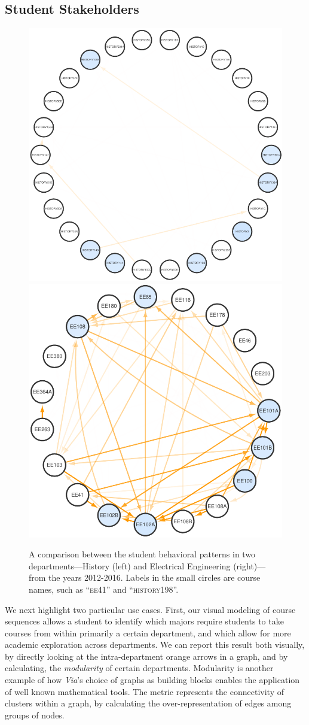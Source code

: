 \subsection{Student Stakeholders}
\label{sec:student-stakeholders}

\begin{figure}
    \centering
    \includegraphics[width=0.55\columnwidth]{Figs/final-modularity-history.pdf}
    \includegraphics[width=0.44\columnwidth]{Figs/final-modularity-ee.pdf}
    \caption{A comparison between the student behavioral patterns in two departments---History (left) and Electrical Engineering (right)---from the years 2012-2016. Labels in the small circles are course names, such as ``\textsc{ee41}'' and ``\textsc{history198}''.}
    \label{fig:modularity}
\end{figure}

We next highlight two particular use cases. First, our visual modeling
of course sequences allows a student to identify which majors require
students to take courses from within primarily a certain department,
and which allow for more academic exploration across departments. We
can report this result both visually, by directly looking at the
intra-department orange arrows in a graph, and by calculating, the
{\em modularity} of certain departments. Modularity is another example
of how {\em Via}'s choice of graphs as building blocks enables the
application of well known mathematical tools. The metric represents
the connectivity of clusters within a graph, by calculating the
over-representation of edges among groups of nodes.

